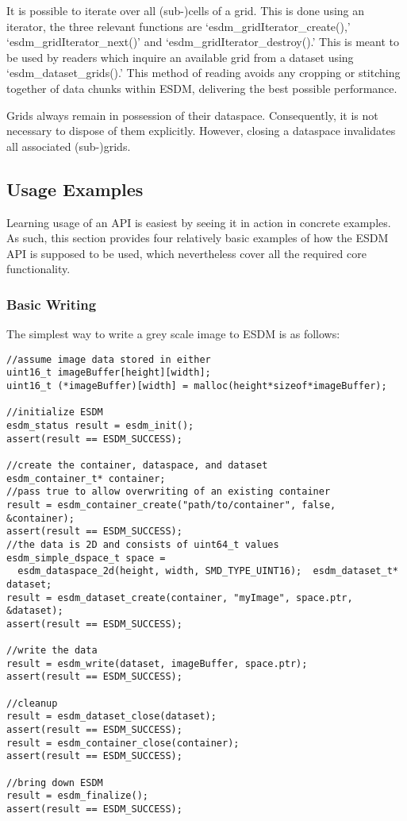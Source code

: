 It is possible to iterate over all (sub-)cells of a grid. This is done
using an iterator, the three relevant functions are
`esdm\_gridIterator\_create(),' `esdm\_gridIterator\_next()' and
`esdm\_gridIterator\_destroy().' This is meant to be used by readers
which inquire an available grid from a dataset using
`esdm\_dataset\_grids().' This method of reading avoids any cropping or
stitching together of data chunks within ESDM, delivering the best
possible performance.

Grids always remain in possession of their dataspace. Consequently, it
is not necessary to dispose of them explicitly. However, closing a
dataspace invalidates all associated (sub-)grids.

\subsection{Usage Examples}
\label{sec:user-guides:usage-example}

Learning usage of an API is easiest by seeing it in action in concrete
examples. As such, this section provides four relatively basic examples
of how the ESDM API is supposed to be used, which nevertheless cover all
the required core functionality.

\subsubsection{Basic Writing}

The simplest way to write a grey scale image to ESDM is as follows:


\begin{lstlisting}
//assume image data stored in either
uint16_t imageBuffer[height][width];
uint16_t (*imageBuffer)[width] = malloc(height*sizeof*imageBuffer);

//initialize ESDM
esdm_status result = esdm_init();
assert(result == ESDM_SUCCESS);

//create the container, dataspace, and dataset
esdm_container_t* container;
//pass true to allow overwriting of an existing container
result = esdm_container_create("path/to/container", false, &container); 
assert(result == ESDM_SUCCESS);
//the data is 2D and consists of uint64_t values
esdm_simple_dspace_t space = 
  esdm_dataspace_2d(height, width, SMD_TYPE_UINT16);  esdm_dataset_t* dataset;
result = esdm_dataset_create(container, "myImage", space.ptr, &dataset);
assert(result == ESDM_SUCCESS);

//write the data
result = esdm_write(dataset, imageBuffer, space.ptr);
assert(result == ESDM_SUCCESS);

//cleanup
result = esdm_dataset_close(dataset);
assert(result == ESDM_SUCCESS);
result = esdm_container_close(container);
assert(result == ESDM_SUCCESS);

//bring down ESDM
result = esdm_finalize();
assert(result == ESDM_SUCCESS);
\end{lstlisting}

